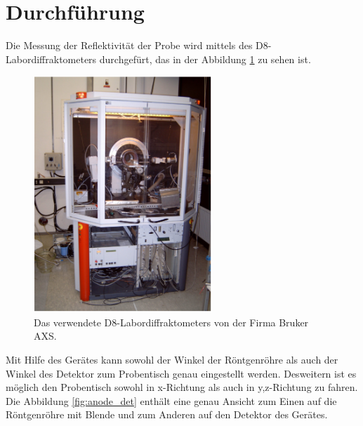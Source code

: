 \section{Durchführung}
\label{sec:Durchführung}
Die Messung der Reflektivität der Probe wird mittels
des D8-Labordiffraktometers
durchgefürt, das in der Abbildung \ref{fig:app} zu sehen ist.
\begin{figure}
  \centering
  \includegraphics[width=0.6\textwidth]{bilder/apparatur.PNG}
  \caption{Das verwendete D8-Labordiffraktometers von der Firma Bruker AXS. \cite{sample}}
  \label{fig:app}
\end{figure}

Mit Hilfe des Gerätes kann sowohl der
Winkel der Röntgenröhre
als auch der Winkel des Detektor zum Probentisch
genau eingestellt werden. Desweitern ist es
möglich den Probentisch sowohl in x-Richtung als auch in
y,z-Richtung zu fahren.
Die Abbildung \ref{fig:anode_det} enthält eine genau
Ansicht zum Einen auf die
Röntgenröhre mit Blende und zum Anderen auf den Detektor des Gerätes.


